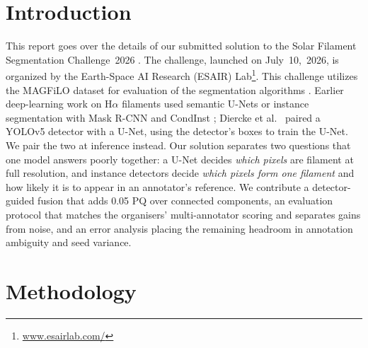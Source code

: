\documentclass[sigconf]{acmart}
\begin{document}
\section{Introduction}
This report goes over the details of our submitted solution to the Solar Filament Segmentation Challenge~2026 \cite{filament-segmentation-2026}. The challenge, launched on July~10,~2026, is organized by the Earth-Space AI Research (ESAIR) Lab\footnote{\href{https://www.esairlab.com/home}{www.esairlab.com/}}. This challenge utilizes the MAGFiLO dataset for evaluation of the segmentation algorithms \cite{ahmadzadeh2024dataset}. Earlier deep-learning work on H$\alpha$ filaments used semantic U-Nets \cite{zhu2019filament,zhu2025flatunet} or instance segmentation with Mask R-CNN \cite{ahmadzadeh2019filament} and CondInst \cite{guo2022filament}; Diercke et al.\ \cite{diercke2024filament} paired a YOLOv5 detector with a U-Net, using the detector's boxes to train the U-Net. We pair the two at inference instead. Our solution separates two questions that one model answers poorly together: a U-Net \cite{ronneberger2015unet} decides \emph{which pixels} are filament at full resolution, and instance detectors decide \emph{which pixels form one filament} and how likely it is to appear in an annotator's reference. We contribute a detector-guided fusion that adds 0.05 PQ over connected components, an evaluation protocol that matches the organisers' multi-annotator scoring and separates gains from noise, and an error analysis placing the remaining headroom in annotation ambiguity and seed variance.

\section{Methodology}\label{sec:methodology}
\end{document}
